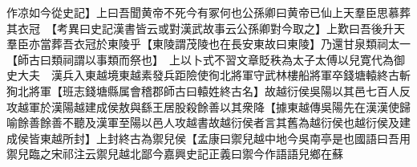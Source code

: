 作凉如今從史記】上曰吾聞黄帝不死今有冢何也公孫卿曰黄帝已仙上天羣臣思慕葬其衣冠　【考異曰史記漢書皆云或對漢武故事云公孫卿對今取之】上歎曰吾後升天羣臣亦當葬吾衣冠於東陵乎【東陵謂茂陵也在長安東故曰東陵】乃還甘泉類祠太一【師古曰類祠謂以事類而祭也】　上以卜式不習文章貶秩為太子太傅以兒寛代為御史大夫　漢兵入東越境東越素發兵距險使徇北將軍守武林樓船將軍卒錢塘轅終古斬狥北將軍【班志錢塘縣属會稽郡師古曰轅姓終古名】故越衍侯吳陽以其邑七百人反攻越軍於漢陽越建成侯敖與繇王居股殺餘善以其衆降【據東越傳吳陽先在漢漢使歸喻餘善餘善不聽及漢軍至陽以邑人攻越書故越衍侯者言其舊為越衍侯也越衍侯及建成侯皆東越所封】上封終古為禦兒侯【孟康曰禦兒越中地今吳南亭是也國語曰吾用禦兒臨之宋祁注云禦兒越北鄙今嘉興史記正義曰禦今作語語兒鄉在蘇